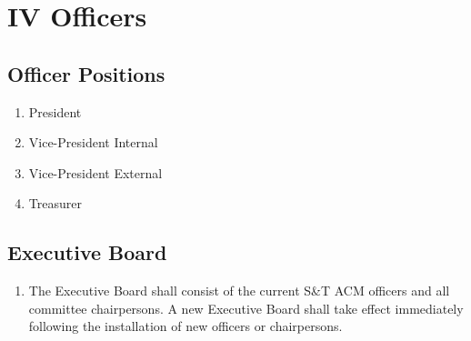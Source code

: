 \section{IV \textendash{} Officers}
\subsection{Officer Positions}
\begin{enumerate}[label=\arabic*.]
  \item President
  \item Vice-President Internal
  \item Vice-President External
  \item Treasurer
\end{enumerate}
\subsection{Executive Board}
\begin{enumerate}[label=\arabic*.]
  \item The Executive Board shall consist of the current S\&T ACM officers and
    all committee chairpersons. A new Executive Board shall take effect
    immediately following the installation of new officers or chairpersons.
\end{enumerate}

